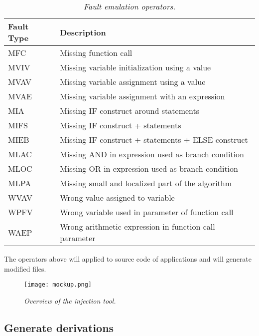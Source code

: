\begin{table}[!ht]
\begin{tabular}{l|l}
\hline
Fault Type & Description                                            \\ \hline
MFC        & Missing function call                                  \\
MVIV       & Missing variable initialization using a value          \\
MVAV       & Missing variable assignment using a value              \\
MVAE       & Missing variable assignment with an expression         \\
MIA        & Missing IF construct around statements                 \\
MIFS       & Missing IF construct + statements                      \\
MIEB       & Missing IF construct + statements + ELSE construct     \\
MLAC       & Missing AND in expression used as branch condition     \\
MLOC       & Missing OR in expression used as branch condition      \\
MLPA       & Missing small and localized part of the algorithm      \\
WVAV       & Wrong value assigned to variable                       \\
WPFV       & Wrong variable used in parameter of function call      \\
WAEP       & Wrong arithmetic expression in function call parameter \\ \hline
\end{tabular}
\caption{\small \sl Fault emulation operators.\label{tab:faultEmulationOperators}}
\end{table}

The operators above will applied to source code of applications and will generate modified files.

\begin{figure}[!ht]
\begin{center}
\texttt{[image: mockup.png]}
\caption{\small \sl Overview of the injection tool.\label{fig:mockup}}
\end{center}
\end{figure}

\subsection{Generate derivations}

